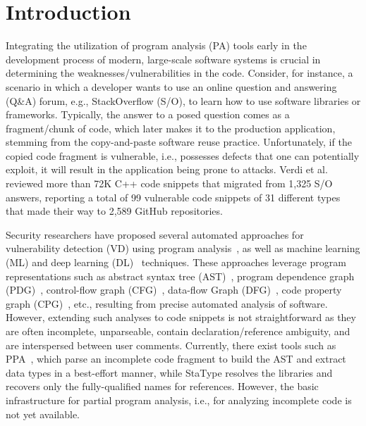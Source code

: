\section{Introduction}
Integrating the utilization of program analysis (PA) tools early in the development process of modern, large-scale software systems is crucial in determining the weaknesses/vulnerabilities in the code. Consider, for instance, a scenario in which a developer wants to use an online question and answering (Q\&A) forum, e.g., StackOverflow (S/O), to learn how to use software libraries or frameworks. Typically, the answer to a posed question comes as a fragment/chunk of code, which later makes it to the production application, stemming from the copy-and-paste software reuse practice. Unfortunately, if the copied code fragment is vulnerable, i.e., possesses defects that one can potentially exploit, it will result in the application being prone to attacks. Verdi et al. \cite{}
reviewed more than 72K C++ code snippets that migrated from 1,325 S/O answers, reporting a total of 99 vulnerable code snippets of 31 different types that made their way to 2,589 GitHub repositories.

Security researchers have proposed several automated approaches for vulnerability detection (VD) using program analysis~\cite{}, as well as machine learning (ML) and deep learning (DL)~\cite{} techniques. These approaches leverage program representations such as abstract syntax tree (AST)~\cite{}, program dependence graph (PDG)~\cite{}, control-flow graph (CFG)~\cite{}, data-flow Graph (DFG)~\cite{}, code property graph (CPG)~\cite{}, etc., resulting from precise automated analysis of software. However, extending such analyses to code snippets is not straightforward as they are often incomplete, unparseable, contain declaration/reference ambiguity, and are interspersed between user comments. Currently, there exist tools such as PPA~\cite{}, which parse an incomplete code fragment to build the AST and extract data types in a best-effort manner, while StaType \cite{} resolves the libraries and recovers only the fully-qualified names for references. However, the basic infrastructure for partial program analysis, i.e., for analyzing incomplete code is not yet available. 

